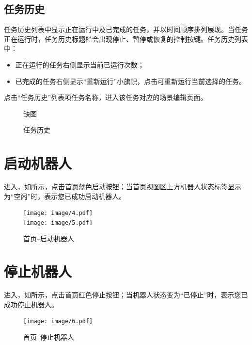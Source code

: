 \subsection{任务历史}
任务历史列表中显示正在运行中及已完成的任务，并以时间顺序排列展现。当任务正在运行时，任务历史标题栏会出现停止、暂停或恢复的控制按键。任务历史列表中：
\begin{itemize}
	\item 正在运行的任务右侧显示当前已运行次数；
	\item 已完成的任务右侧显示“重新运行”小旗帜，点击可重新运行当前选择的任务。
\end{itemize}

 	
点击“任务历史”列表项任务名称，进入该任务对应的场景编辑页面。

\begin{figure}[ht]
	\centering
	\color{red}缺图
	\caption{任务历史}
	\label{fig:任务历史}
\end{figure}

\section{启动机器人}
进入\LM ，如所示，点击首页蓝色启动按钮；当首页视图区上方机器人状态标签显示为“空闲”时，表示您已成功启动机器人。

\begin{figure}[ht]
	\centering
	\texttt{[image: image/4.pdf]}\\
	\texttt{[image: image/5.pdf]}
	\caption{\LM  首页--启动机器人}
	\label{fig:启动机器人}
\end{figure}

\section{停止机器人}
进入\LM ，如所示，点击首页红色停止按钮；当机器人状态变为“已停止”时，表示您已成功停止机器人。

\begin{figure}[ht]
	\centering
	\texttt{[image: image/6.pdf]}
	\caption{\LM  首页--停止机器人}
	\label{fig:停止机器人}
\end{figure}

